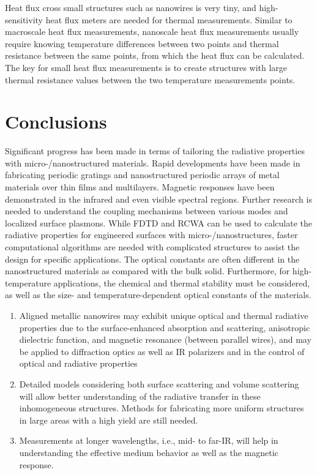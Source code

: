 \documentclass[article,authoryear,jfv]{beg_32}             %
\begin{document}
Heat flux cross small structures such as nanowires is very tiny, and
high-sensitivity heat flux meters are needed for thermal measurements.
Similar to macroscale heat flux measurements, nanoscale heat flux
measurements usually require knowing temperature differences between two
points and thermal resistance between the same points, from which the heat
flux can be calculated. The key for small heat flux measurements is to
create structures with large thermal resistance values between the two
temperature measurements points.




\section{Conclusions}

Significant progress has been made in terms of tailoring the radiative
properties with micro-/nanost\-ructured materials. Rapid developments have
been made in fabricating periodic gratings and nanostructured periodic
arrays of metal materials over thin films and multilayers. Magnetic
responses have been demonstrated in the infrared and even visible spectral
regions. Further research is needed to understand the coupling mechanisms
between various modes and localized surface plasmons. While FDTD and RCWA
can be used to calculate the radiative properties for engineered surfaces
with micro-/nanostructures, faster computational algorithms are needed with
complicated structures to assist the design for specific applications. The
optical constants are often different in the nanostructured materials as
compared with the bulk solid. Furthermore, for high-temperature
applications, the chemical and thermal stability must be considered, as well
as the size- and temperature-dependent optical constants of the materials.
\begin{enumerate}
  \item Aligned metallic nanowires may exhibit unique optical and thermal radiative
properties due to the surface-enhanced absorption and scattering,
anisotropic dielectric function, and magnetic resonance (between parallel
wires), and may be applied to diffraction optics as well as IR polarizers
and in the control of optical and radiative properties
  \item Detailed models
considering both surface scattering and volume scattering will allow better
understanding of the radiative transfer in these inhomogeneous structures.
Methods for fabricating more uniform structures in large areas with a high
yield are still needed.
  \item Measurements at longer wavelengths, i.e., mid- to
far-IR, will help in understanding the effective medium behavior as well as
the magnetic response.
\end{enumerate}
\end{document}

